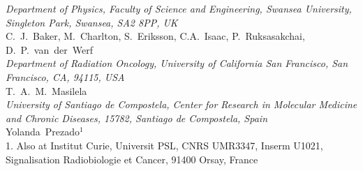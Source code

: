 \noindent \textit{Department of Physics, Faculty of Science and Engineering, Swansea University, Singleton Park, Swansea, SA2 8PP, UK} \\
C.~J.~Baker, M.~Charlton, S.~Eriksson, C.A.~Isaac, P.~Ruksasakchai, D.~P.~van~der~Werf \\
 
\noindent \textit{Department of Radiation Oncology, University of California San Francisco, San Francisco, CA, 94115, USA} \\
T.~A.~M.~Masilela \\
 
\noindent \textit{University of Santiago de Compostela, Center for Research in Molecular Medicine and Chronic Diseases, 15782, Santiago de Compostela, Spain} \\
Yolanda~Prezado$^{1}$ \\
{\footnotesize
  1. Also at Institut Curie, Universit PSL, CNRS UMR3347, Inserm U1021, Signalisation Radiobiologie et Cancer, 91400 Orsay, France \\
}
 
\vspace{0.5cm}
